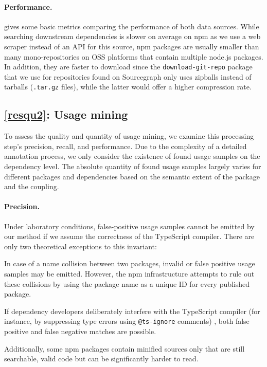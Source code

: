 \documentclass[a4paper,twoside]{article}
\begin{document}
\paragraph{Performance.}
\label{sec:evaluation/resqu1/performance}
 gives some basic metrics comparing the performance of both data sources. 
While searching downstream dependencies is slower on average on npm as we use a web scraper instead of an API for this source, npm packages are usually smaller than many mono-repositories on OSS platforms that contain multiple node.js packages. 
In addition, they are faster to download since the \texttt{download-git-repo} package that we use for repositories found on Sourcegraph only uses zipballs instead of tarballs (\texttt{.tar.gz} files), while the latter would offer a higher compression rate.

\subsection{\ref{resqu2}: Usage mining}
To assess the quality and quantity of usage mining, we examine this processing step's precision, recall, and performance.
Due to the complexity of a detailed annotation process, we only consider the existence of found usage samples on the dependency level.
The absolute quantity of found usage samples largely varies for different packages and dependencies based on the semantic extent of the package and the coupling.%

\paragraph{Precision.}
Under laboratory conditions, false-positive usage samples cannot be emitted by our method if we assume the correctness of the TypeScript compiler.
There are only two theoretical exceptions to this invariant:
\begin{enumerate*}[label=(\roman*)]
	\item In case of a name collision between two packages, invalid or false positive usage samples may be emitted.
        However, the npm infrastructure attempts to rule out these collisions by using the package name as a unique ID for every published package.
	\item If dependency developers deliberately interfere with the TypeScript compiler (for instance, 
	    by suppressing type errors using \texttt{@ts-ignore} comments)%
	    , both false positive and false negative matches are possible.
\end{enumerate*}
Additionally, some npm packages contain minified sources only that are still searchable, valid code but can be significantly harder to read.
\end{document}
